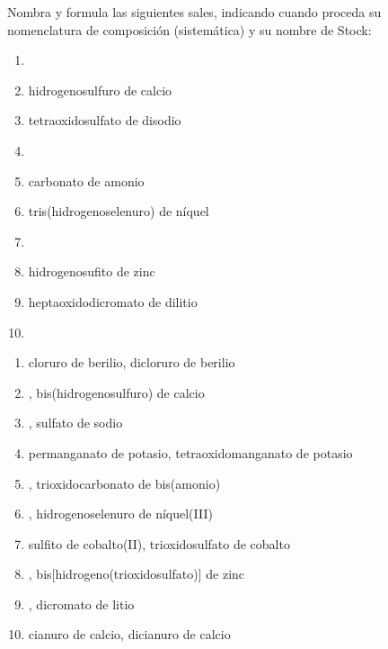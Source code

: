 \documentclass[10pt,a5paper,twoside]{article}
\begin{document}
\begin{exercise}[
    tags    = {inorgánica,sales, sales binarias,sales ternarias},
    topics  = {química inorgánica,formulación,nomenclatura},
    source  = {SAN Formulación, p29, e37},
  ]
  Nombra y formula las siguientes sales, indicando cuando proceda su nomenclatura de composición (sistemática) y su nombre de Stock:

  \begin{enumerate}
    \item {}
    \item hidrogenosulfuro de calcio
    \item tetraoxidosulfato de disodio
    \item {}
    \item carbonato de amonio
    \item tris(hidrogenoselenuro) de níquel
    \item {}
    \item hidrogenosufito de zinc
    \item heptaoxidodicromato de dilitio
    \item {}
  \end{enumerate}
\end{exercise}

\begin{solution}
  \begin{enumerate}
    \item cloruro de berilio, dicloruro de berilio
    \item {}, bis(hidrogenosulfuro) de calcio
    \item {}, sulfato de sodio
    \item permanganato de potasio, tetraoxidomanganato de potasio
    \item {}, trioxidocarbonato de bis(amonio)
    \item {}, hidrogenoselenuro de níquel(III)
    \item sulfito de cobalto(II), trioxidosulfato de cobalto
    \item {}, bis[hidrogeno(trioxidosulfato)] de zinc
    \item {}, dicromato de litio
    \item cianuro de calcio, dicianuro de calcio
  \end{enumerate}
\end{solution}
\end{document}
